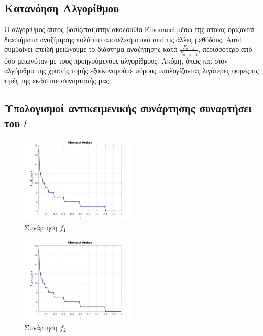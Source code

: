\subsection{Κατανόηση Αλγορίθμου}
Ο αλγόριθμος αυτός βασίζεται στην ακολουθία Fibonacci
μέσω της οποίας ορίζονται διαστήματα αναζήτησης πολύ πιο αποτελεσματικά από τις άλλες μεθόδους. Αυτό 
συμβαίνει επειδή μειώνουμε το διάστημα αναζήτησης κατά $\frac{F_{n-k}}{F_{n-k-1}}$, περισσότερο από όσο
μειωνόταν με τους προηγούμενους αλγορίθμους. Ακόμη, όπως και στον αλγόριθμο της χρυσής τομής εξοικονομούμε
πόρους υπολογίζοντας λιγότερες φορές τις τιμές της εκάστοτε συνάρτησής μας.

\subsection{Υπολογισμοί αντικειμενικής συνάρτησης συναρτήσει του $l$}
\begin{figure}[H] %
    \centering
    \includegraphics[width=0.5\textwidth]{media/fibonaccif1} %
    \caption{Συνάρτηση $f_1$}
\end{figure}

\begin{figure}[H] %
    \centering
    \includegraphics[width=0.5\textwidth]{media/fibonaccif2} %
    \caption{Συνάρτηση $f_2$}
\end{figure}

